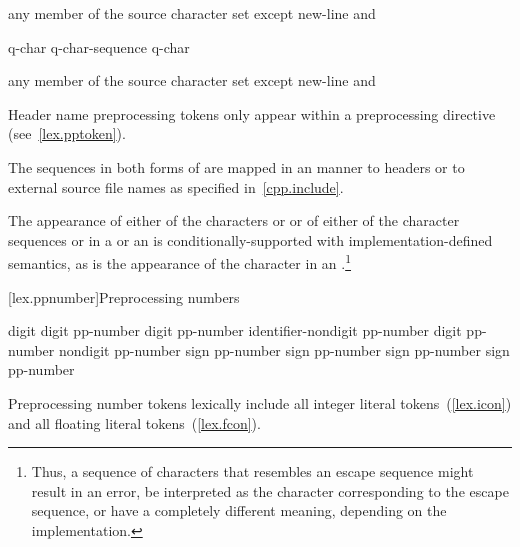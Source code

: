 \begin{bnf}
\br
    \textnormal{any member of the source character set except new-line and \terminal{>}}
\end{bnf}

\begin{bnf}
\br
    q-char\br
    q-char-sequence q-char
\end{bnf}

\begin{bnf}
\br
    \textnormal{any member of the source character set except new-line and }
\end{bnf}

\pnum
\begin{note} Header name preprocessing tokens only appear within a
 preprocessing directive (see~\ref{lex.pptoken}). \end{note}
The sequences in both forms of  are mapped in an
 manner to headers or to
external source file names as specified in~\ref{cpp.include}.

\pnum
The appearance of either of the characters  or \tcode{\textbackslash} or of
either of the character sequences \tcode{/*} or \tcode{//} in a
 or an 
is conditionally-supported with implementation-defined semantics,
as is the appearance of the
character  in an .\footnote{Thus, a
sequence of characters that resembles an escape sequence might result in an
error, be interpreted as the character corresponding to the escape sequence, or
have a completely different meaning, depending on the implementation.}%

[lex.ppnumber]{Preprocessing numbers}

%
\begin{bnf}
\br
    digit\br
     digit\br
    pp-number digit\br
    pp-number identifier-nondigit\br
    pp-number  digit\br
    pp-number  nondigit\br
    pp-number  sign\br
    pp-number  sign\br
    pp-number  sign\br
    pp-number  sign\br
    pp-number 
\end{bnf}

\pnum
Preprocessing number tokens lexically include all integer literal
tokens~(\ref{lex.icon}) and all floating literal
tokens~(\ref{lex.fcon}).

